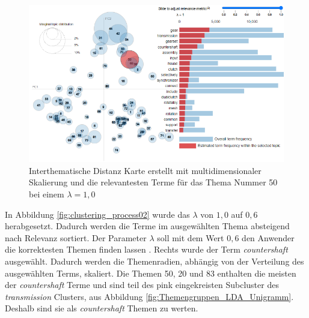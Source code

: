 \begin{landscape}
 \begin{figure}[htpb]
	\centering
	\includegraphics[width=19.29cm,keepaspectratio=true]{img/clustering_process01.png}
	\caption{
		Interthematische Distanz Karte erstellt mit multidimensionaler Skalierung und die relevantesten Terme für das Thema Nummer 50 bei einem $\lambda = 1,0$
	}
	\label{fig:clustering_process01}
 \end{figure}
\end{landscape}

 
 
In Abbildung \ref{fig:clustering_process02} wurde das $\lambda$ von $1,0$ auf $0,6$ herabgesetzt. Dadurch werden die Terme im ausgewählten Thema absteigend nach Relevanz sortiert. Der Parameter $\lambda$ soll mit dem Wert $0,6$ den Anwender die korrektesten  Themen finden lassen \parencite[vgl.][S. 66-68]{sievert2014ldavis}. Rechts wurde der Term \emph{countershaft} ausgewählt. Dadurch werden die Themenradien, abhängig von der Verteilung des ausgewählten Terms, skaliert. Die Themen 50, 20 und 83 enthalten die meisten der \emph{countershaft} Terme und sind teil des pink eingekreisten Subcluster des \emph{transmission} Clusters, aus Abbildung \ref{fig:Themengruppen_LDA_Unigramm}. Deshalb sind sie als \emph{countershaft} Themen zu werten.

